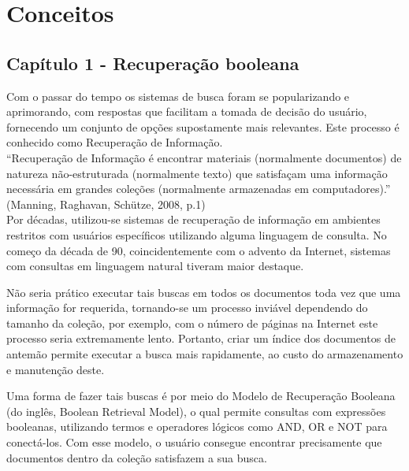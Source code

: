 \chapter{Conceitos}
\label{cap:conceitos}


\section{Capítulo 1 - Recuperação booleana}
\label{sec:recuperacao_booleana}

Com o passar do tempo os sistemas de busca foram se popularizando e aprimorando, com respostas que facilitam a tomada de decisão do usuário, fornecendo um conjunto de opções supostamente mais relevantes. Este processo é conhecido como Recuperação de Informação. \\

“Recuperação de Informação é encontrar materiais (normalmente documentos) de natureza não-estruturada (normalmente texto) que satisfaçam uma informação necessária em grandes coleções (normalmente armazenadas em computadores).” (Manning, Raghavan, Schütze, 2008, p.1) \\

Por décadas, utilizou-se sistemas de recuperação de informação em ambientes restritos com usuários específicos utilizando alguma linguagem de consulta. No começo da década de 90, coincidentemente com o advento da Internet, sistemas com consultas em linguagem natural tiveram maior destaque.

Não seria prático executar tais buscas em todos os documentos toda vez que uma informação for requerida, tornando-se um processo inviável dependendo do tamanho da coleção, por exemplo, com o número de páginas na Internet este processo seria extremamente lento. Portanto, criar um índice dos documentos de antemão permite executar a busca mais rapidamente, ao custo do armazenamento e manutenção deste.

Uma forma de fazer tais buscas é por meio do Modelo de Recuperação Booleana (do inglês, Boolean Retrieval Model), o qual permite consultas com expressões booleanas, utilizando termos e operadores lógicos como AND, OR e NOT para conectá-los. Com esse modelo, o usuário consegue encontrar precisamente que documentos dentro da coleção satisfazem a sua busca. 


